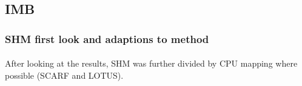 \documentclass{article}
\begin{document}
    \subsection{IMB}

        \subsubsection{SHM first look and adaptions to method}
            \label{subsubsection:SHM-first-look}

            \paragraph{}
            After looking at the results, SHM was further divided by CPU mapping where possible (SCARF and LOTUS).
\end{document}
